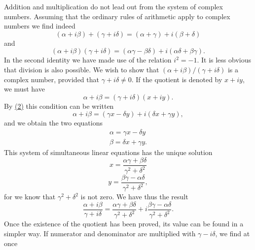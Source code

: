Addition and multiplication do not lead out from the system of complex numbers. Assuming that the ordinary rules of arithmetic apply to complex numbers we find indeed
\begin{equation*}
(\alpha + i \beta) + (\gamma + i \delta) = (\alpha + \gamma) + i (\beta + \delta)\tag{1}\label{eq:1.1}
\end{equation*}
and
\begin{equation*}
(\alpha + i \beta) (\gamma + i \delta) = (\alpha \gamma - \beta \delta) + i (\alpha \delta + \beta \gamma).\tag{2}\label{eq:1.2}
\end{equation*}
In the second identity we have made use of the relation $i^{2} = -1$. It is less obvious that division is also possible. We wish to
show that $(\alpha + i\beta)/(\gamma + i\delta)$ is a complex number, provided that $\gamma + i\delta \neq 0$. If the quotient is denoted by $x + iy$, we must have
\begin{equation*}
\alpha + i \beta = (\gamma + i \delta) (x + i y).
\end{equation*}
By \hyperref[eq:1.2]{(2)} this condition can be written
\begin{equation*}
\alpha + i \beta = (\gamma x - \delta y) + i (\delta x + \gamma y),
\end{equation*}
and we obtain the two equations
\begin{equation*}
\begin{array}{l} \alpha = \gamma x - \delta y \\ \beta = \delta x + \gamma y. \end{array}
\end{equation*}
This system of simultaneous linear equations has the unique solution
\begin{equation*}
x = \frac {\alpha \gamma + \beta \delta}{\gamma^ {2} + \delta^ {2}}
\end{equation*}
\begin{equation*}
y = \frac {\beta \gamma - \alpha \delta}{\gamma^ {2} + \delta^ {2}},
\end{equation*}
for we know that $\gamma^2 +\delta^2$ is not zero. We have thus the result
\begin{equation*}
\frac {\alpha + i \beta}{\gamma + i \delta} = \frac {\alpha \gamma + \beta \delta}{\gamma^ {2} + \delta^ {2}} + i \frac {\beta \gamma - \alpha \delta}{\gamma^ {2} + \delta^ {2}}.\tag{3}\label{eq:1.3}
\end{equation*}
Once the existence of the quotient has been proved, its value can be found in a simpler way. If numerator and denominator are multiplied with $\gamma - i\delta$, we find at once
